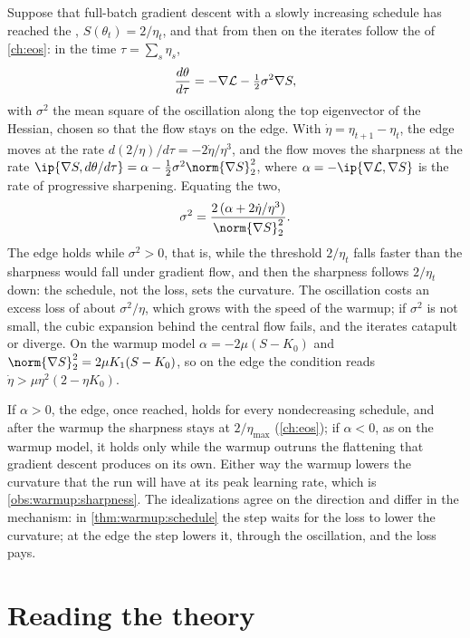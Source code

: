 \begin{refsection}
\begin{heuristic}
Suppose that full-batch gradient descent with a slowly increasing schedule has reached the , $S(\theta_t)=2/\eta_t$, and that from then on the iterates follow the  of \cref{ch:eos}: in the time $\tau=\sum_s\eta_s$,
\[
  \frac{d\theta}{d\tau}=-\nabla\mathcal{L}-\tfrac12\sigma^2\nabla S,
\]
with $\sigma^2$ the mean square of the oscillation along the top eigenvector of the Hessian, chosen so that the flow stays on the edge. With $\dot\eta=\eta_{t+1}-\eta_t$, the edge moves at the rate $d(2/\eta)/d\tau=-2\dot\eta/\eta^3$, and the flow moves the sharpness at the rate $\ip{\nabla S,d\theta/d\tau}=\alpha-\frac12\sigma^2\norm{\nabla S}_2^2$, where $\alpha=-\ip{\nabla\Loss,\nabla S}$ is the rate of progressive sharpening. Equating the two,
\[
  \sigma^2=\frac{2\,(\alpha+2\dot\eta/\eta^3)}{\norm{\nabla S}_2^2}.
\]
The edge holds while $\sigma^2>0$, that is, while the threshold $2/\eta_t$ falls faster than the sharpness would fall under gradient flow, and then the sharpness follows $2/\eta_t$ down: the schedule, not the loss, sets the curvature. The oscillation costs an excess loss of about $\sigma^2/\eta$, which grows with the speed of the warmup; if $\sigma^2$ is not small, the cubic expansion behind the central flow fails, and the iterates catapult or diverge. On the warmup model $\alpha=-2\mu(S-K_0)$ and $\norm{\nabla S}_2^2=2\mu K_1(S-K_0)$, so on the edge the condition reads $\dot\eta>\mu\eta^2(2-\eta K_0)$.
\end{heuristic}

If $\alpha>0$, the edge, once reached, holds for every nondecreasing schedule, and after the warmup the sharpness stays at $2/\eta_{\max}$ (\cref{ch:eos}); if $\alpha<0$, as on the warmup model, it holds only while the warmup outruns the flattening that gradient descent produces on its own. Either way the warmup lowers the curvature that the run will have at its peak learning rate, which is \cref{obs:warmup:sharpness}. The idealizations agree on the direction and differ in the mechanism: in \cref{thm:warmup:schedule} the step waits for the loss to lower the curvature; at the edge the step lowers it, through the oscillation, and the loss pays.

\section{Reading the theory}\label{sec:warmup:reading}


\end{refsection}
